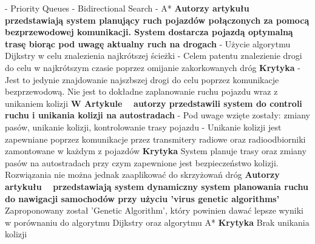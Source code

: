   \newline
  - Priority Queues
  \newline
  - Bidirectional Search
  \newline
  - A*
  \newline
\newline
\newline
\textbf{Autorzy artykułu ~\cite{gazis1997optimal} przedstawiają system planujący ruch pojazdów połączonych za pomocą bezprzewodowej komunikacji. System dostarcza pojazdą optymalną trasę biorąc pod uwagę aktualny ruch na drogach}
\newline
- Użycie algorytmu Dijkstry w celu znalezienia najkrótszej ścieżki
\newline
- Celem patentu znalezienie drogi do celu w najkrótszym czasie poprzez omijanie zakorkowanych dróg
\newline
\newline
\textbf{Krytyka}
\newline
- Jest to jedynie znajdowanie najszbszej drogi do celu poprzez komunikacje bezprzewodową. Nie jest to dokładne zaplanowanie ruchu pojazdu wraz z unikaniem kolizji
\newline
\newline
\textbf{W Artykule ~\cite{broxmeyer1994vehicle} autorzy przedstawili system do controli ruchu i unikania kolizji na autostradach}
\newline
- Pod uwage wzięte zostały: zmiany pasów, unikanie kolizji, kontrolowanie trasy pojazdu
\newline
- Unikanie kolizji jest zapewniane poprzez komunikacje przez transmitery radiowe oraz radioodbiorniki zamontowane w każdym z pojazdów
\newline
\newline
\textbf{Krytyka}
\newline
System planuje trasy oraz zmiany pasów na autostradach przy czym zapewnione jest bezpieczeństwo kolizji. Rozwiązania nie można jednak zaaplikować do skrzyżowań dróg
\newline
\newline
\textbf{Autorzy artykułu ~\cite{kanoh2007dynamic} przedstawiają system dynamiczny system planowania ruchu do nawigacji samochodów przy użyciu 'virus genetic algorithms'}
\newline
Zaproponowany został 'Genetic Algorithm', który powinien dawać lepsze wyniki w porównaniu do algorytmu Dijkstry oraz algorytmu A*
\newline
\textbf{Krytyka}
\newline
\newline
Brak unikania kolizji

